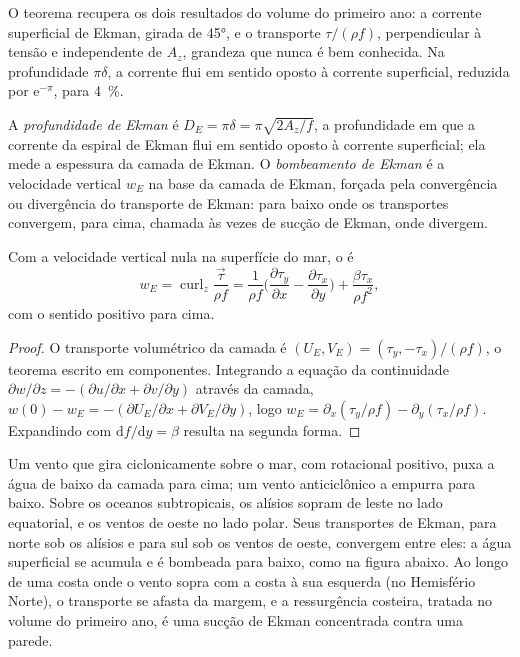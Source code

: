 O teorema recupera os dois resultados do volume do primeiro ano: a corrente
superficial de Ekman, girada de \ang{45}, e o transporte $\tau/(\rho f)$, perpendicular à
tensão e independente de $A_z$, grandeza que nunca é bem conhecida. Na
profundidade $\pi\delta$, a corrente flui em sentido oposto à corrente superficial, reduzida
por $\mathrm e^{-\pi}$, para \qty{4}{\percent}.

\begin{definition}\label{def:b3:ocean-dynamics:ekman-pumping}
A \emph{profundidade de Ekman} é $D_E = \pi\delta =
\pi\sqrt{2A_z/f}$, a profundidade em que a corrente da espiral de Ekman
flui em sentido oposto à corrente superficial; ela mede a espessura da
camada de Ekman. O \emph{bombeamento de Ekman} é a
velocidade vertical $w_E$ na base da camada de Ekman, forçada pela convergência ou
divergência do transporte de Ekman: para baixo onde os transportes
convergem, para cima, chamada às vezes de sucção de Ekman, onde divergem.
\end{definition}

\begin{proposition}\label{prop:b3:ocean-dynamics:pumping}
Com a velocidade vertical nula na superfície do mar, o  é
\[
w_E = \operatorname{curl}_z\frac{\vec\tau}{\rho f}
= \frac{1}{\rho f}\Big(\frac{\partial\tau_y}{\partial x} -
\frac{\partial\tau_x}{\partial y}\Big) + \frac{\beta\tau_x}{\rho f^2} ,
\]
com o sentido positivo para cima.
\end{proposition}

\begin{proof}
O transporte volumétrico da camada é $(U_E, V_E) = (\tau_y,
-\tau_x)/(\rho f)$, o teorema escrito em componentes. Integrando a
equação da continuidade $\partial w/\partial z = -(\partial u/\partial x +
\partial v/\partial y)$ através da camada, $w(0) - w_E = -(\partial
U_E/\partial x + \partial V_E/\partial y)$, logo $w_E = \partial_x(\tau_y/\rho
f) - \partial_y(\tau_x/\rho f)$. Expandindo com $\mathrm df/\mathrm dy =
\beta$ resulta na segunda forma.
\end{proof}

Um vento que gira ciclonicamente sobre o mar, com rotacional positivo, puxa
a água de baixo da camada para cima; um vento anticiclônico a empurra para baixo. Sobre
os oceanos subtropicais, os alísios sopram de leste no
lado equatorial, e os ventos de oeste no lado polar. Seus transportes de Ekman,
para norte sob os alísios e para sul sob os ventos de oeste,
convergem entre eles: a água superficial se acumula e é bombeada para baixo, como
na figura abaixo. Ao longo de uma costa onde o
vento sopra com a costa à sua esquerda (no Hemisfério Norte), o
transporte se afasta da margem, e a ressurgência costeira, tratada no
volume do primeiro ano, é uma sucção de Ekman concentrada contra uma parede.

